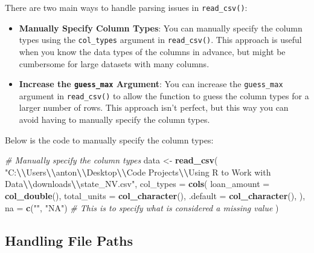 \documentclass[
]{book}
\newenvironment{Shaded}{\begin{snugshade}}{\end{snugshade}}
\newcommand{\AttributeTok}[1]{\textcolor[rgb]{0.13,0.29,0.53}{#1}}
\newcommand{\CommentTok}[1]{\textcolor[rgb]{0.56,0.35,0.01}{\textit{#1}}}
\newcommand{\FunctionTok}[1]{\textcolor[rgb]{0.13,0.29,0.53}{\textbf{#1}}}
\newcommand{\NormalTok}[1]{#1}
\newcommand{\OtherTok}[1]{\textcolor[rgb]{0.56,0.35,0.01}{#1}}
\newcommand{\SpecialCharTok}[1]{\textcolor[rgb]{0.81,0.36,0.00}{\textbf{#1}}}
\newcommand{\StringTok}[1]{\textcolor[rgb]{0.31,0.60,0.02}{#1}}
\providecommand{\tightlist}{%
  \setlength{\itemsep}{0pt}\setlength{\parskip}{0pt}}
\begin{document}
There are two main ways to handle parsing issues in \texttt{read\_csv()}:

\begin{itemize}
\tightlist
\item
  \textbf{Manually Specify Column Types}: You can manually specify the column types using the \texttt{col\_types} argument in \texttt{read\_csv()}. This approach is useful when you know the data types of the columns in advance, but might be cumbersome for large datasets with many columns.
\item
  \textbf{Increase the \texttt{guess\_max} Argument}: You can increase the \texttt{guess\_max} argument in \texttt{read\_csv()} to allow the function to guess the column types for a larger number of rows. This approach isn't perfect, but this way you can avoid having to manually specify the column types.
\end{itemize}

Below is the code to manually specify the column types:

\begin{Shaded}
\begin{Highlighting}[]
\CommentTok{\# Manually specify the column types}
\NormalTok{data }\OtherTok{\textless{}{-}} \FunctionTok{read\_csv}\NormalTok{(}
  \StringTok{"C:}\SpecialCharTok{\textbackslash{}\textbackslash{}}\StringTok{Users}\SpecialCharTok{\textbackslash{}\textbackslash{}}\StringTok{anton}\SpecialCharTok{\textbackslash{}\textbackslash{}}\StringTok{Desktop}\SpecialCharTok{\textbackslash{}\textbackslash{}}\StringTok{Code Projects}\SpecialCharTok{\textbackslash{}\textbackslash{}}\StringTok{Using R to Work with Data}\SpecialCharTok{\textbackslash{}\textbackslash{}}\StringTok{downloads}\SpecialCharTok{\textbackslash{}\textbackslash{}}\StringTok{state\_NV.csv"}\NormalTok{,}
  \AttributeTok{col\_types =} \FunctionTok{cols}\NormalTok{(}
    \AttributeTok{loan\_amount =} \FunctionTok{col\_double}\NormalTok{(),}
    \AttributeTok{total\_units =} \FunctionTok{col\_character}\NormalTok{(),}
    \AttributeTok{.default =} \FunctionTok{col\_character}\NormalTok{(),}
\NormalTok{  ),}
  \AttributeTok{na =} \FunctionTok{c}\NormalTok{(}\StringTok{""}\NormalTok{, }\StringTok{"NA"}\NormalTok{) }\CommentTok{\# This is to specify what is considered a missing value}
\NormalTok{  )}
\end{Highlighting}
\end{Shaded}

\subsection{Handling File Paths}\label{handling-file-paths}
\end{document}
